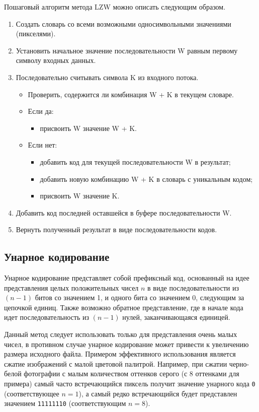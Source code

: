 Пошаговый алгоритм метода LZW можно описать следующим образом.
\begin{enumerate}
    \item Создать словарь со всеми возможными односимвольными значениями (пикселями).
    \item Установить начальное значение последовательности W равным первому символу входных данных.
    \item Последовательно считывать символа K из входного потока.
    \begin{itemize}
        \item Проверить, содержится ли комбинация W + K в текущем словаре.
        \item Если да:
        \begin{itemize}
            \item присвоить W значение W + K.
        \end{itemize} 
        \item Если нет:
        \begin{itemize}
            \item добавить код для текущей последовательности W в результат;
            \item добавить новую комбинацию W + K в словарь с уникальным кодом;
            \item присвоить W значение K.
        \end{itemize}
    \end{itemize}
    \item Добавить код последней оставшейся в буфере последовательности W.
    \item Вернуть полученный результат в виде последовательности кодов.
\end{enumerate}

\subsection{Унарное кодирование}

Унарное кодирование \cite{UnaryEncoding} представляет собой префиксный код, основанный на идее представления целых положительных чисел $n$ в виде последовательности из $(n - 1)$ битов со значением 1, и одного бита со значением 0, следующим за цепочкой единиц. Также возможно обратное представление, где в начале кода идет последовательность из $(n - 1)$ нулей, заканчивающаяся единицей.

Данный метод следует использовать только для представления очень малых чисел, в противном случае унарное кодирование может привести к увеличению размера исходного файла. Примером эффективного использования является сжатие изображений с малой цветовой палитрой. Например, при сжатии черно-белой фотографии с малым количеством оттенков серого (с 8 оттенками для примера) самый часто встречающийся пиксель получит значение унарного кода \texttt{0} (соответствующее $n = 1$), а самый редко встречающийся будет представлен значением \texttt{11111110} (соответствующим $n = 8$).

